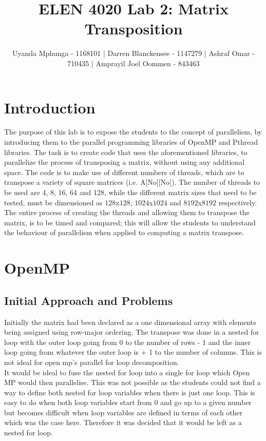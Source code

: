 \documentclass[journal, a4paper]{IEEEtran}
\begin{document}
	\title{ELEN 4020 Lab 2: Matrix Transposition}

	\author{\small Uyanda Mphunga - 1168101 | Darren Blanckensee - 1147279 | 
Ashraf Omar - 710435 | Amprayil Joel Oommen - 843463}

	\maketitle

\section{Introduction}
The purpose of this lab is to expose the students to the concept of parallelism, by introducing them to the parallel programming libraries of OpenMP and Pthread libraries. The task is to create code that uses the aforementioned libraries, to parallelize the process of transposing a matrix, without using any additional space. The code is to make use of different numbers of threads, which are to transpose a variety of square matrices (i.e. A[No][No]). The number of threads to be used are 4, 8, 16, 64 and 128, while the different matrix sizes that need to be tested, must be dimensioned as $128$x$128$, $1024$x$1024$ and $8192$x$8192$ respectively. The entire process of creating the threads and allowing them to transpose the matrix, is to be timed and compared; this will allow the students to understand the behaviour of parallelism when applied to computing a matrix transpose. 


\section{OpenMP}
\subsection{Initial Approach and Problems}
\noindent
Initially the matrix had been declared as a one dimensional array with elements being assigned using row-major ordering. The transpose was done in a nested for loop with the outer loop going from 0 to the number of rows - 1 and the inner loop going from whatever the outer loop is + 1 to the number of columns. This is not ideal for open mp's parallel for loop decomposition.\\


 It would be ideal to fuse the nested for loop into a single for loop which Open MP would then parallelise. This was not possible as the students could not find a way to define both nested for loop variables when there is just one loop. This is easy to do when both loop variables start from 0 and go up to a given number but becomes difficult when loop variables are defined in terms of each other which was the case here. Therefore it was decided that it would be left as a nested for loop. \\
\end{document}
